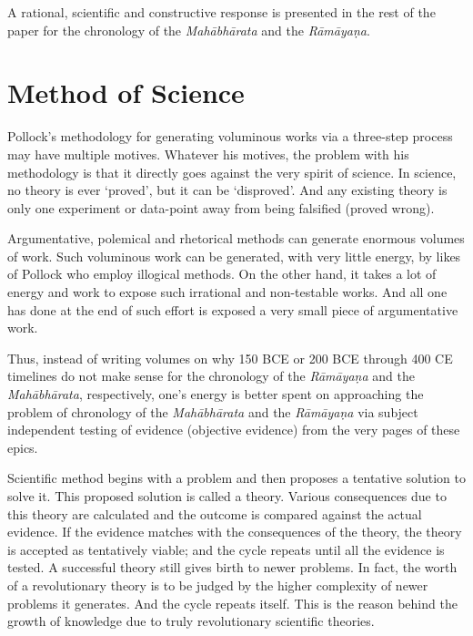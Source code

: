 A rational, scientific and constructive response is presented in the rest of the paper for the chronology of the \textit{Mahābhārata} and the \textit{Rāmāyaṇa}.

\vspace{-.3cm}

\section*{Method of Science}

Pollock’s methodology for generating voluminous works via a three-step process may have multiple motives. Whatever his motives, the problem with his methodology is that it directly goes against the very spirit of science. In science, no theory is ever ‘proved’, but it can be ‘disproved’. And any existing theory is only one experiment or data-point away from being falsified (proved wrong).

Argumentative, polemical and rhetorical methods can generate enormous volumes of work. Such voluminous work can be generated, with very little energy, by likes of Pollock who employ illogical methods. On the other hand, it takes a lot of energy and work to expose such irrational and non-testable works. And all one has done at the end of such effort is exposed a very small piece of argumentative work.

Thus, instead of writing volumes on why 150 BCE or 200 BCE through 400 CE timelines do not make sense for the chronology of the \textit{Rāmāyaṇa} and the \textit{Mahābhārata}, respectively, one’s energy is better spent on approaching the problem of chronology of the \textit{Mahābhārata} and the \textit{Rāmāyaṇa} via subject independent testing of evidence (objective evidence) from the very pages of these epics.

Scientific method begins with a problem and then proposes a tentative solution to solve it. This proposed solution is called a theory. Various consequences due to this theory are calculated and the outcome is compared against the actual evidence. If the evidence matches with the consequences of the theory, the theory is accepted as tentatively viable; and the cycle repeats until all the evidence is tested. A successful theory still gives birth to newer problems. In fact, the worth of a revolutionary theory is to be judged by the higher complexity of newer problems it generates. And the cycle repeats itself. This is the reason behind the growth of knowledge due to truly revolutionary scientific theories.

